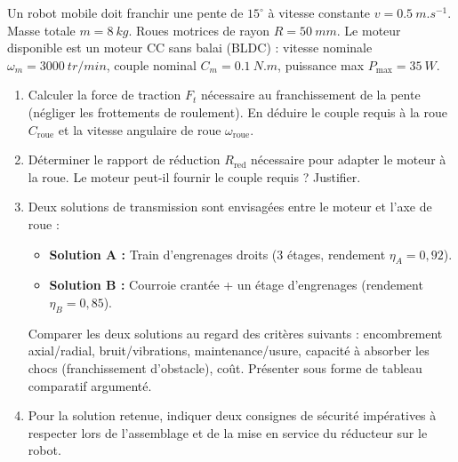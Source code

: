 \documentclass[11pt]{article}
\begin{document}
\begin{exercice}
Un robot mobile doit franchir une pente de $15^\circ$ à vitesse constante $v = \SI{0.5}{m.s^{-1}}$. Masse totale $m = \SI{8}{kg}$. Roues motrices de rayon $R = \SI{50}{mm}$. Le moteur disponible est un moteur CC sans balai (BLDC) : vitesse nominale $\omega_m = \SI{3000}{tr/min}$, couple nominal $C_m = \SI{0.1}{N.m}$, puissance max $P_{\text{max}} = \SI{35}{W}$.

\begin{enumerate}
    \item Calculer la force de traction $F_t$ nécessaire au franchissement de la pente (négliger les frottements de roulement). En déduire le couple requis à la roue $C_{\text{roue}}$ et la vitesse angulaire de roue $\omega_{\text{roue}}$.
    \item Déterminer le rapport de réduction $R_{\text{red}}$ nécessaire pour adapter le moteur à la roue. Le moteur peut-il fournir le couple requis ? Justifier.
    \item Deux solutions de transmission sont envisagées entre le moteur et l'axe de roue :
    \begin{itemize}
        \item \textbf{Solution A :} Train d'engrenages droits (3 étages, rendement $\eta_A = 0,92$).
        \item \textbf{Solution B :} Courroie crantée + un étage d'engrenages (rendement $\eta_B = 0,85$).
    \end{itemize}
    Comparer les deux solutions au regard des critères suivants : encombrement axial/radial, bruit/vibrations, maintenance/usure, capacité à absorber les chocs (franchissement d'obstacle), coût. Présenter sous forme de tableau comparatif argumenté.
    \item Pour la solution retenue, indiquer deux consignes de sécurité impératives à respecter lors de l'assemblage et de la mise en service du réducteur sur le robot.
\end{enumerate}
\end{exercice}
\end{document}
